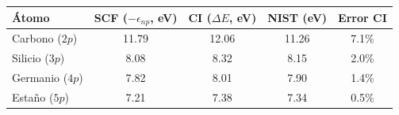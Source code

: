 \begin{tabular}{lcccc}
    \toprule
    \textbf{Átomo} & \textbf{SCF ($-\epsilon_{np}$, eV)} & \textbf{CI ($\Delta E$, eV)} & \textbf{NIST (eV)} & \textbf{Error CI} \\
    \midrule
    Carbono ($2p$) & 11.79 & 12.06 & 11.26 & 7.1\% \\
    Silicio ($3p$) & 8.08 & 8.32 & 8.15 & 2.0\% \\
    Germanio ($4p$) & 7.82 & 8.01 & 7.90 & 1.4\% \\
    Estaño ($5p$) & 7.21 & 7.38 & 7.34 & 0.5\% \\
    \bottomrule
\end{tabular}
